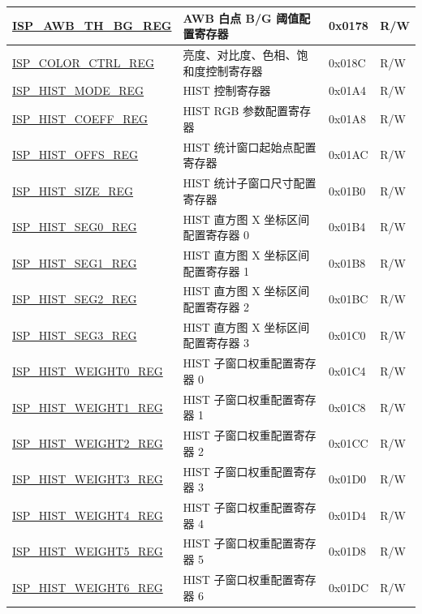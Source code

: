 \begin{longtable}{ | p{6cm} | p{7.2cm} | p{1.3cm} | p{1cm} | }
\hyperref[regdesc:ISPAWBTHBGREG]{ISP\_AWB\_TH\_BG\_REG} & AWB 白点 B/G 阈值配置寄存器 & 0x0178 & R/W \\ \hline
\hyperref[regdesc:ISPCOLORCTRLREG]{ISP\_COLOR\_CTRL\_REG} & 亮度、对比度、色相、饱和度控制寄存器 & 0x018C & R/W \\ \hline
\hyperref[regdesc:ISPHISTMODEREG]{ISP\_HIST\_MODE\_REG} & HIST 控制寄存器 & 0x01A4 & R/W \\ \hline
\hyperref[regdesc:ISPHISTCOEFFREG]{ISP\_HIST\_COEFF\_REG} & HIST RGB 参数配置寄存器 & 0x01A8 & R/W \\ \hline
\hyperref[regdesc:ISPHISTOFFSREG]{ISP\_HIST\_OFFS\_REG} & HIST 统计窗口起始点配置寄存器 & 0x01AC & R/W \\ \hline
\hyperref[regdesc:ISPHISTSIZEREG]{ISP\_HIST\_SIZE\_REG} & HIST 统计子窗口尺寸配置寄存器 & 0x01B0 & R/W \\ \hline
\hyperref[regdesc:ISPHISTSEG0REG]{ISP\_HIST\_SEG0\_REG} & HIST 直方图 X 坐标区间配置寄存器 0 & 0x01B4 & R/W \\ \hline
\hyperref[regdesc:ISPHISTSEG1REG]{ISP\_HIST\_SEG1\_REG} & HIST 直方图 X 坐标区间配置寄存器 1 & 0x01B8 & R/W \\ \hline
\hyperref[regdesc:ISPHISTSEG2REG]{ISP\_HIST\_SEG2\_REG} & HIST 直方图 X 坐标区间配置寄存器 2 & 0x01BC & R/W \\ \hline
\hyperref[regdesc:ISPHISTSEG3REG]{ISP\_HIST\_SEG3\_REG} & HIST 直方图 X 坐标区间配置寄存器 3 & 0x01C0 & R/W \\ \hline
\hyperref[regdesc:ISPHISTWEIGHT0REG]{ISP\_HIST\_WEIGHT0\_REG} & HIST 子窗口权重配置寄存器 0 & 0x01C4 & R/W \\ \hline
\hyperref[regdesc:ISPHISTWEIGHT1REG]{ISP\_HIST\_WEIGHT1\_REG} & HIST 子窗口权重配置寄存器 1 & 0x01C8 & R/W \\ \hline
\hyperref[regdesc:ISPHISTWEIGHT2REG]{ISP\_HIST\_WEIGHT2\_REG} & HIST 子窗口权重配置寄存器 2 & 0x01CC & R/W \\ \hline
\hyperref[regdesc:ISPHISTWEIGHT3REG]{ISP\_HIST\_WEIGHT3\_REG} & HIST 子窗口权重配置寄存器 3 & 0x01D0 & R/W \\ \hline
\hyperref[regdesc:ISPHISTWEIGHT4REG]{ISP\_HIST\_WEIGHT4\_REG} & HIST 子窗口权重配置寄存器 4 & 0x01D4 & R/W \\ \hline
\hyperref[regdesc:ISPHISTWEIGHT5REG]{ISP\_HIST\_WEIGHT5\_REG} & HIST 子窗口权重配置寄存器 5 & 0x01D8 & R/W \\ \hline
\hyperref[regdesc:ISPHISTWEIGHT6REG]{ISP\_HIST\_WEIGHT6\_REG} & HIST 子窗口权重配置寄存器 6 & 0x01DC & R/W \\ \hline

\end{longtable}
